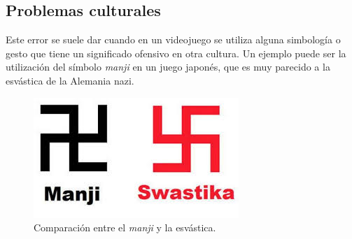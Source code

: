 \subsection{Problemas culturales}\label{ErrorCultura}
Este error se suele dar cuando en un videojuego se utiliza alguna simbología o gesto que tiene un significado ofensivo en otra cultura. Un ejemplo puede ser la utilización del símbolo \textit{manji} en un juego japonés, que es muy parecido a la esvástica de la Alemania nazi.
\begin{figure}[h]
	
	\centering
	\includegraphics{Imagenes/BugsLQA/Manji.jpg}
	\caption{Comparación entre el \textit{manji} y la esvástica.}
	\label{Manji}
\end{figure}

